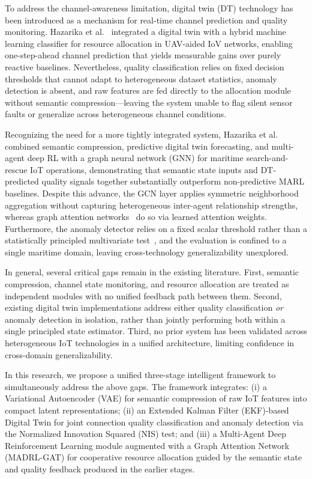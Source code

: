 To address the channel-awareness limitation, digital twin (DT) technology has
been introduced as a mechanism for real-time channel prediction and quality
monitoring. Hazarika et al.~\cite{ref_dt_uav} integrated a digital twin with
a hybrid machine learning classifier for resource allocation in UAV-aided IoV
networks, enabling one-step-ahead channel prediction that yields measurable
gains over purely reactive baselines. Nevertheless, quality classification
relies on fixed decision thresholds that cannot adapt to heterogeneous dataset
statistics, anomaly detection is absent, and raw features are fed directly to
the allocation module without semantic compression---leaving the system unable
to flag silent sensor faults or generalize across heterogeneous channel
conditions.

Recognizing the need for a more tightly integrated system, Hazarika
et al.~\cite{ref_semadt} combined semantic compression, predictive digital
twin forecasting, and multi-agent deep RL with a graph neural network (GNN)
for maritime search-and-rescue IoT operations, demonstrating that semantic
state inputs and DT-predicted quality signals together substantially outperform
non-predictive MARL baselines. Despite this advance, the GCN layer applies
symmetric neighborhood aggregation without capturing heterogeneous inter-agent
relationship strengths, whereas graph attention networks~\cite{ref_gat_comm}
do so via learned attention weights. Furthermore, the anomaly detector relies
on a fixed scalar threshold rather than a statistically principled multivariate
test~\cite{ref_anomaly_survey,ref_lof}, and the evaluation is confined to a
single maritime domain, leaving cross-technology generalizability unexplored.

In general, several critical gaps remain in the existing literature. First,
semantic compression, channel state monitoring, and resource allocation are
treated as independent modules with no unified feedback path between them.
Second, existing digital twin implementations address either quality
classification \emph{or} anomaly detection in isolation, rather than jointly
performing both within a single principled state estimator. Third, no prior
system has been validated across heterogeneous IoT technologies in a unified
architecture, limiting confidence in cross-domain generalizability.

In this research, we propose a unified three-stage intelligent framework to
simultaneously address the above gaps. The framework integrates: (i) a
Variational Autoencoder (VAE) for semantic compression of raw IoT features
into compact latent representations; (ii) an Extended Kalman Filter
(EKF)-based Digital Twin for joint connection quality classification and
anomaly detection via the Normalized Innovation Squared (NIS) test; and
(iii) a Multi-Agent Deep Reinforcement Learning module augmented with a
Graph Attention Network (MADRL-GAT) for cooperative resource allocation
guided by the semantic state and quality feedback produced in the earlier
stages.

